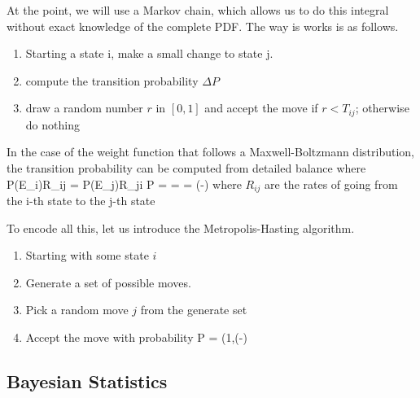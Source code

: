 At the point, we will use a Markov chain, which allows us to do this integral without exact knowledge of the complete PDF.  The way is works is as follows.  
\begin{enumerate}
    \item Starting a state i, make a small change to state j.
    \item compute the transition probability $\Delta P$
    \item draw a random number $r$ in $[0,1]$ and accept the move if $r<T_{ij}$; otherwise do nothing
\end{enumerate}
In the case of the weight function that follows a Maxwell-Boltzmann distribution, the transition probability can be computed from detailed balance where 
\be
 P(E_i)R_{ij} = P(E_j)R_{ji} \rightarrow  \Delta P =  =  = \exp\left(-\right)
\ee
where $R_{ij}$ are the rates of going from the i-th state to the j-th state

To encode all this, let us introduce the Metropolis-Hasting algorithm.  
\begin{enumerate}
    \item Starting with some state $i$
    \item Generate a set of possible moves.
    \item Pick a random move $j$ from the generate set
    \item Accept the move with probability 
    \be
    P = \min\left(1,\exp(-\right)
    \ee
\end{enumerate}

\subsection{Bayesian Statistics}

